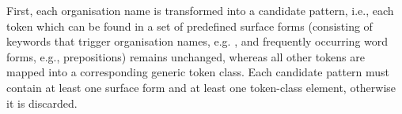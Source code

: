 \documentclass[output=paper]{langsci/langscibook}
\begin{document}
{{{{{{{{{{{{{{{\ili{}\noindent\ili{}\textbf{}\ili{} First\ili{},\ili{} each\ili{} organisation\ili{} name\ili{} is\ili{} transformed\ili{} into\ili{} a\ili{} candidate\ili{} pattern\ili{},\ili{} i\ili{}.e\ili{}.\ili{},\ili{} each\ili{} token\ili{} which\ili{} can\ili{} be\ili{} found\ili{} in\ili{} a\ili{} set\ili{} of\ili{} predefined\ili{} surface\ili{} forms\ili{} \ili{}(consisting\ili{} of\ili{} keywords\ili{} that\ili{} trigger\ili{} organisation\ili{} names\ili{},\ili{} e\ili{}.g\ili{}.\ili{} \ili{} \ili{}\textit{}\ili{},\ili{} and\ili{} frequently\ili{} occurring\ili{} word\ili{} forms\ili{},\ili{} e\ili{}.g\ili{}.\ili{},\ili{} prepositions\ili{})\ili{} remains\ili{} unchanged\ili{},\ili{} whereas\ili{} all\ili{} other\ili{} tokens\ili{} are\ili{} mapped\ili{} into\ili{} a\ili{} corresponding\ili{} generic\ili{} token\ili{} class\ili{}.\ili{} Each\ili{} candidate\ili{} pattern\ili{} must\ili{} contain\ili{} at\ili{} least\ili{} one\ili{} surface\ili{} form\ili{} and\ili{} at\ili{} least\ili{} one\ili{} token\ili{}-class\ili{} element\ili{},\ili{}
otherwise\ili{} it\ili{} is\ili{} discarded\ili{}.\ili{}
\ili{}
}}}}}}}}}}}}}}}
\end{document}
